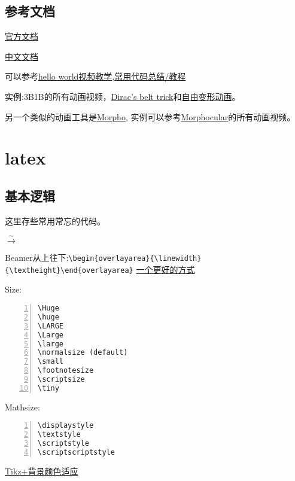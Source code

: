 \documentclass[11pt]{amsart}
\begin{document}
\subsection{参考文档}
\href{https://3b1b.github.io/manim/}{官方文档}

\href{https://docs.manim.org.cn/}{中文文档}

可以参考\href{https://www.bilibili.com/video/BV1KD4y1D7xD}{hello world视频教学},\href{https://www.bilibili.com/video/BV1p54y197cC}{常用代码总结/教程} 

实例:3B1B的所有动画视频，\href{https://www.youtube.com/watch?v=ACZC_XEyg9U&list=PLnQX-jgAF5pTkwtUuVpqS5tuWmJ-6ZM-Z&index=10}{Dirac's belt trick}和\href{https://www.bilibili.com/video/BV1sK4y1V7TE}{自由变形动画}。

另一个类似的动画工具是\href{https://github.com/morpho-matters/morpholib}{Morpho}, 实例可以参考\href{https://www.youtube.com/@morphocular}{Morphocular}的所有动画视频。

\section{latex} 
\subsection{基本逻辑}
这里存些常用常忘的代码。

$\stackrel{\sim}{\longrightarrow}$


Beamer从上往下:\lstinline|\begin{overlayarea}{\linewidth}{\textheight}\end{overlayarea}|
\href{https://tex.stackexchange.com/questions/458136/beamer-how-to-keep-an-image-at-its-location-while-using-only-to-uncover-text}{一个更好的方式}


Size:
\begin{lstlisting}[numbers=left,numberstyle=\tiny,numbersep=10pt]
\Huge
\huge
\LARGE
\Large
\large
\normalsize (default)
\small
\footnotesize
\scriptsize
\tiny
\end{lstlisting}

Mathsize:
\begin{lstlisting}[numbers=left,numberstyle=\tiny,numbersep=10pt]
\displaystyle
\textstyle
\scriptstyle
\scriptscriptstyle
\end{lstlisting}

\href{https://tex.stackexchange.com/questions/286442/how-to-change-color-and-transparency-of-arrows-in-tikz}{Tikz+背景颜色适应}
\end{document}
